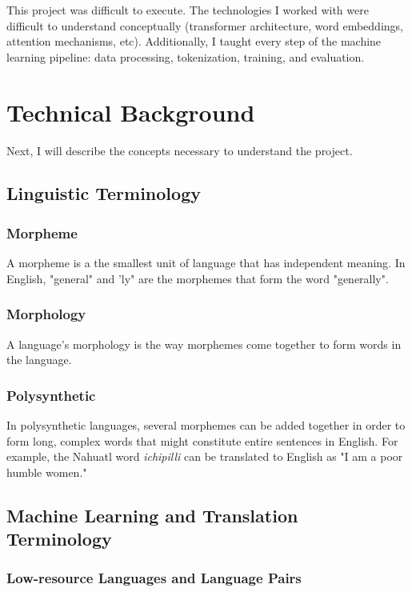 \documentclass[10pt,twocolumn]{article}
\begin{document}
This project was difficult to execute. The technologies I worked with were difficult to understand conceptually (transformer architecture, word embeddings, attention mechanisms, etc). Additionally, I taught every step of the machine learning pipeline: data processing, tokenization, training, and evaluation. 


\section{Technical Background}
Next, I will describe the concepts necessary to understand the project. 

\subsection{Linguistic Terminology}

\subsubsection{Morpheme}

A morpheme is a the smallest unit of language that has independent meaning. In English, "general" and 'ly" are the morphemes that form the word "generally". \cite{Polysynethic}


\subsubsection{Morphology}

A language's morphology is the way morphemes come together to form words in the language.  \cite{Polysynethic}


\subsubsection{Polysynthetic}

In polysynthetic languages, several morphemes can be added together in order to form long, complex words that might constitute entire sentences in English. \cite{Polysynethic}
For example, the Nahuatl word \textit{ichipilli} can be translated to English as "I am a poor humble women." 


\subsection{Machine Learning and Translation Terminology}
\subsubsection{Low-resource Languages and Language Pairs}
\end{document}
